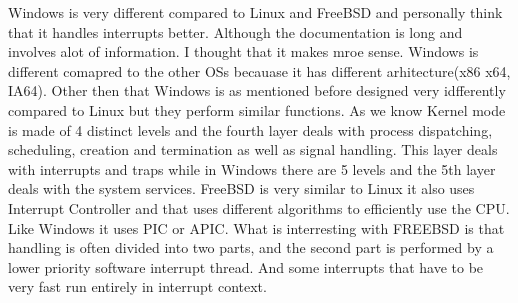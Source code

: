 \documentclass[letterpaper,10pt,draftclsnofoot,onecolumn]{IEEEtran}
\begin{document}
Windows is very different compared to Linux and FreeBSD and personally think that it handles interrupts better. Although the documentation is long and involves alot of information. I thought that it makes mroe sense. Windows is different comapred to the other OSs becauase it has different arhitecture(x86 x64, IA64). Other then that Windows is as mentioned before designed very idfferently compared to Linux but they perform similar functions. As we know Kernel mode is made of 4 distinct levels and the fourth layer deals with process dispatching, scheduling, creation and termination as well as signal handling. This layer deals with interrupts and traps while in Windows there are 5 levels and the 5th layer deals with the system services.
FreeBSD is very similar to Linux it also uses Interrupt Controller and that uses different algorithms to efficiently use the CPU. Like Windows it uses PIC or APIC. What is interresting with FREEBSD is that handling is often divided into two parts, and the second part is performed by a lower priority software interrupt thread. And some interrupts that have to be very fast run entirely in interrupt context.



\end{document}
